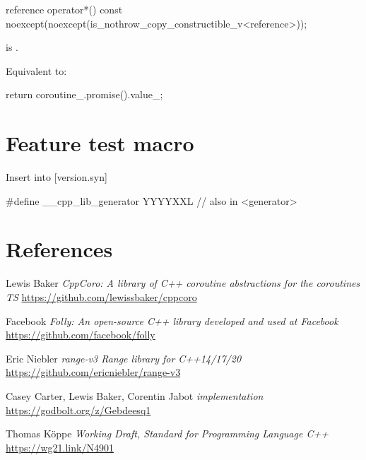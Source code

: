 \documentclass{wg21}
\begin{document}
\begin{addedblock}
\begin{itemdecl}
reference operator*() const
  noexcept(noexcept(is_nothrow_copy_constructible_v<reference>));
\end{itemdecl}

\begin{itemdescr}
\precondition {} is .

\effects
Equivalent to:
\begin{codeblock}
    return coroutine_.promise().value_;
\end{codeblock}
\end{itemdescr}


\end{addedblock}

\section{Feature test macro}

Insert into [version.syn]

\begin{addedblock}
\begin{codeblock}
    #define __cpp_lib_generator YYYYXXL // also in <generator>
\end{codeblock}
\end{addedblock}


\section{References}
\renewcommand{\section}[2]{}%



\begin{thebibliography}{9}
    Lewis Baker
    \emph{CppCoro: A library of C++ coroutine abstractions for the coroutines TS}\newline
    \url{https://github.com/lewissbaker/cppcoro}

    Facebook
    \emph{Folly: An open-source C++ library developed and used at Facebook}\newline
    \url{https://github.com/facebook/folly}


    Eric Niebler
    \emph{range-v3 Range library for C++14/17/20}\newline
    \url{https://github.com/ericniebler/range-v3}

    Casey Carter, Lewis Baker, Corentin Jabot
    \emph{ implementation}\newline
    \url{https://godbolt.org/z/Gebdeesq1}

    Thomas Köppe
    \emph{Working Draft, Standard for Programming Language C++}\newline
    \url{https://wg21.link/N4901}


\end{thebibliography}
\end{document}
